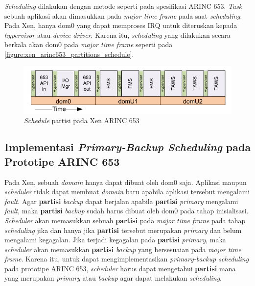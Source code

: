 \textit{Scheduling} dilakukan dengan metode seperti pada spesifikasi ARINC 653.
\textit{Task} sebuah aplikasi akan dimasukkan pada \textit{major time frame} pada saat \textit{scheduling}.
Pada Xen, hanya dom0 yang dapat memproses IRQ untuk diteruskan kepada \textit{hypervisor} atau \textit{device driver}.
Karena itu, \textit{scheduling} yang dilakukan secara berkala akan dom0 pada \textit{major time frame} seperti pada \autoref{figure:xen_arinc653_partitions_schedule}.

\begin{figure}[htbp]
    \includegraphics[scale=0.6]{resources/xen-arinc653-partition-schedule.png}
    \caption{\textit{Schedule} partisi pada Xen ARINC 653}
    \label{figure:xen_arinc653_partitions_schedule}
\end{figure}

\subsection{Implementasi \textit{Primary-Backup Scheduling} pada Prototipe ARINC 653}

Pada Xen, sebuah \textit{domain} hanya dapat dibuat oleh dom0 saja.
Aplikasi maupun \textit{scheduler} tidak dapat membuat \textit{domain} baru apabila aplikasi tersebut mengalami \textit{fault}.
Agar \textbf{partisi} \textit{backup} dapat berjalan apabila \textbf{partisi} \textit{primary} mengalami \textit{fault}, maka \textbf{partisi} \textit{backup} sudah harus dibuat oleh dom0 pada tahap inisialisasi.
\textit{Scheduler} akan memasukkan sebuah \textbf{partisi} pada \textit{major time frame} pada tahap \textit{scheduling} jika dan hanya jika \textbf{partisi} tersebut merupakan \textit{primary} dan belum mengalami kegagalan.
Jika terjadi kegagalan pada \textbf{partisi} \textit{primary}, maka \textit{scheduler} akan memasukkan \textbf{partisi} \textit{backup} yang bersesuaian pada \textit{major time frame}.
Karena itu, untuk dapat mengimplementasikan \textit{primary-backup scheduling} pada prototipe ARINC 653, \textit{scheduler} harus dapat mengetahui \textbf{partisi} mana yang merupakan \textit{primary} atau \textit{backup} agar dapat melakukan \textit{scheduling}.

